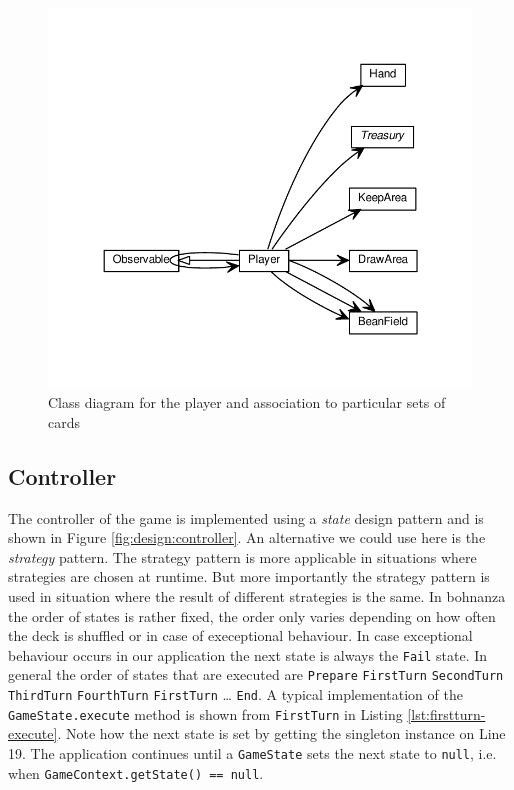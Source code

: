 \begin{figure}[h!] 
    \includegraphics[width=\textwidth]{../umlgraph/PlayerGraph}
    \caption{Class diagram for the player and association to particular sets of cards}
    \label{fig:design:player}
\end{figure}

\newpage
\subsection{Controller}
The controller of the game is implemented using a \emph{state} design pattern and is shown in Figure
\ref{fig:design:controller}. An alternative we could use here is the \emph{strategy} pattern. The strategy pattern is more applicable in
situations where strategies are chosen at runtime. But more importantly the strategy pattern is used in situation where the result of
different strategies is the same. In bohnanza the order of states is rather fixed, the order only varies depending on how often the deck is
shuffled or in case of execeptional behaviour. In case exceptional behaviour occurs in our application the next state is always the
\texttt{Fail} state. In general the order of states that are executed are \texttt{Prepare} \textrightarrow{} \texttt{FirstTurn}
\textrightarrow{} \texttt{SecondTurn} \textrightarrow{} \texttt{ThirdTurn} \textrightarrow{} \texttt{FourthTurn} \textrightarrow{}
\texttt{FirstTurn} \textrightarrow{} \ldots \textrightarrow{} \texttt{End}. A typical implementation of the \texttt{GameState.execute}
method is shown from \texttt{FirstTurn} in Listing \ref{lst:firstturn-execute}. Note how the next state is set by getting the singleton
instance on Line 19.
The application continues until a \texttt{GameState} sets the next state to \texttt{null}, i.e. when \texttt{GameContext.getState() == null}.

